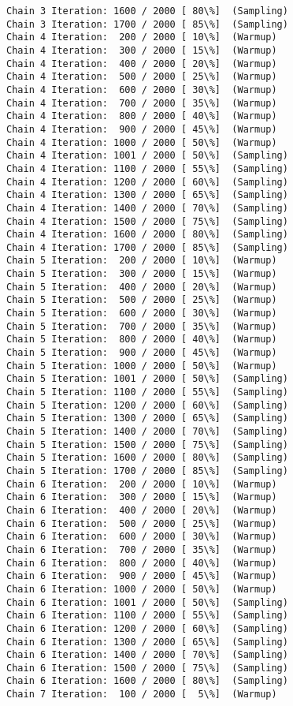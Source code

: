\documentclass[11pt]{article}
\begin{document}
\begin{Verbatim}[commandchars=\\\{\}]
Chain 3 Iteration: 1600 / 2000 [ 80\%]  (Sampling)
Chain 3 Iteration: 1700 / 2000 [ 85\%]  (Sampling)
Chain 4 Iteration:  200 / 2000 [ 10\%]  (Warmup)
Chain 4 Iteration:  300 / 2000 [ 15\%]  (Warmup)
Chain 4 Iteration:  400 / 2000 [ 20\%]  (Warmup)
Chain 4 Iteration:  500 / 2000 [ 25\%]  (Warmup)
Chain 4 Iteration:  600 / 2000 [ 30\%]  (Warmup)
Chain 4 Iteration:  700 / 2000 [ 35\%]  (Warmup)
Chain 4 Iteration:  800 / 2000 [ 40\%]  (Warmup)
Chain 4 Iteration:  900 / 2000 [ 45\%]  (Warmup)
Chain 4 Iteration: 1000 / 2000 [ 50\%]  (Warmup)
Chain 4 Iteration: 1001 / 2000 [ 50\%]  (Sampling)
Chain 4 Iteration: 1100 / 2000 [ 55\%]  (Sampling)
Chain 4 Iteration: 1200 / 2000 [ 60\%]  (Sampling)
Chain 4 Iteration: 1300 / 2000 [ 65\%]  (Sampling)
Chain 4 Iteration: 1400 / 2000 [ 70\%]  (Sampling)
Chain 4 Iteration: 1500 / 2000 [ 75\%]  (Sampling)
Chain 4 Iteration: 1600 / 2000 [ 80\%]  (Sampling)
Chain 4 Iteration: 1700 / 2000 [ 85\%]  (Sampling)
Chain 5 Iteration:  200 / 2000 [ 10\%]  (Warmup)
Chain 5 Iteration:  300 / 2000 [ 15\%]  (Warmup)
Chain 5 Iteration:  400 / 2000 [ 20\%]  (Warmup)
Chain 5 Iteration:  500 / 2000 [ 25\%]  (Warmup)
Chain 5 Iteration:  600 / 2000 [ 30\%]  (Warmup)
Chain 5 Iteration:  700 / 2000 [ 35\%]  (Warmup)
Chain 5 Iteration:  800 / 2000 [ 40\%]  (Warmup)
Chain 5 Iteration:  900 / 2000 [ 45\%]  (Warmup)
Chain 5 Iteration: 1000 / 2000 [ 50\%]  (Warmup)
Chain 5 Iteration: 1001 / 2000 [ 50\%]  (Sampling)
Chain 5 Iteration: 1100 / 2000 [ 55\%]  (Sampling)
Chain 5 Iteration: 1200 / 2000 [ 60\%]  (Sampling)
Chain 5 Iteration: 1300 / 2000 [ 65\%]  (Sampling)
Chain 5 Iteration: 1400 / 2000 [ 70\%]  (Sampling)
Chain 5 Iteration: 1500 / 2000 [ 75\%]  (Sampling)
Chain 5 Iteration: 1600 / 2000 [ 80\%]  (Sampling)
Chain 5 Iteration: 1700 / 2000 [ 85\%]  (Sampling)
Chain 6 Iteration:  200 / 2000 [ 10\%]  (Warmup)
Chain 6 Iteration:  300 / 2000 [ 15\%]  (Warmup)
Chain 6 Iteration:  400 / 2000 [ 20\%]  (Warmup)
Chain 6 Iteration:  500 / 2000 [ 25\%]  (Warmup)
Chain 6 Iteration:  600 / 2000 [ 30\%]  (Warmup)
Chain 6 Iteration:  700 / 2000 [ 35\%]  (Warmup)
Chain 6 Iteration:  800 / 2000 [ 40\%]  (Warmup)
Chain 6 Iteration:  900 / 2000 [ 45\%]  (Warmup)
Chain 6 Iteration: 1000 / 2000 [ 50\%]  (Warmup)
Chain 6 Iteration: 1001 / 2000 [ 50\%]  (Sampling)
Chain 6 Iteration: 1100 / 2000 [ 55\%]  (Sampling)
Chain 6 Iteration: 1200 / 2000 [ 60\%]  (Sampling)
Chain 6 Iteration: 1300 / 2000 [ 65\%]  (Sampling)
Chain 6 Iteration: 1400 / 2000 [ 70\%]  (Sampling)
Chain 6 Iteration: 1500 / 2000 [ 75\%]  (Sampling)
Chain 6 Iteration: 1600 / 2000 [ 80\%]  (Sampling)
Chain 7 Iteration:  100 / 2000 [  5\%]  (Warmup)

\end{Verbatim}
\end{document}
